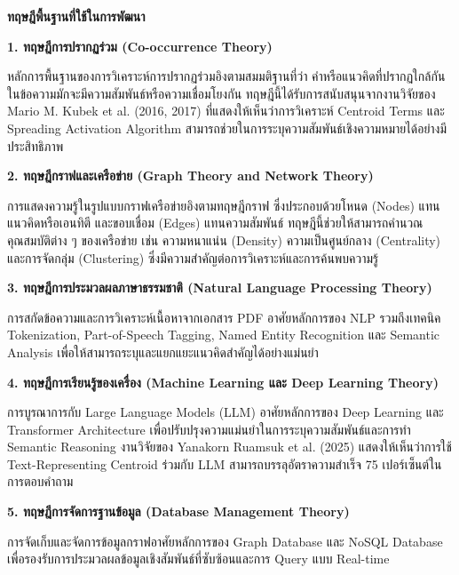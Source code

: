 \documentclass[12pt,a4paper]{article}
\begin{document}
\begin{enumerate}[leftmargin=2cm]
{\begin{enumerate}
            \textbf{ทฤษฎีพื้นฐานที่ใช้ในการพัฒนา}

            \textbf{1. ทฤษฎีการปรากฏร่วม (Co-occurrence Theory)}

            \hspace{1cm}หลักการพื้นฐานของการวิเคราะห์การปรากฏร่วมอิงตามสมมติฐานที่ว่า คำหรือแนวคิดที่ปรากฏใกล้กันในข้อความมักจะมีความสัมพันธ์หรือความเชื่อมโยงกัน ทฤษฎีนี้ได้รับการสนับสนุนจากงานวิจัยของ Mario M. Kubek et al. (2016, 2017) ที่แสดงให้เห็นว่าการวิเคราะห์ Centroid Terms และ Spreading Activation Algorithm สามารถช่วยในการระบุความสัมพันธ์เชิงความหมายได้อย่างมีประสิทธิภาพ

            \textbf{2. ทฤษฎีกราฟและเครือข่าย (Graph Theory and Network Theory)}

            \hspace{1cm}การแสดงความรู้ในรูปแบบกราฟเครือข่ายอิงตามทฤษฎีกราฟ ซึ่งประกอบด้วยโหนด (Nodes) แทนแนวคิดหรือเอนทิตี และขอบเชื่อม (Edges) แทนความสัมพันธ์ ทฤษฎีนี้ช่วยให้สามารถคำนวณคุณสมบัติต่าง ๆ ของเครือข่าย เช่น ความหนาแน่น (Density) ความเป็นศูนย์กลาง (Centrality) และการจัดกลุ่ม (Clustering) ซึ่งมีความสำคัญต่อการวิเคราะห์และการค้นพบความรู้

            \textbf{3. ทฤษฎีการประมวลผลภาษาธรรมชาติ (Natural Language Processing Theory)}

            \hspace{1cm}การสกัดข้อความและการวิเคราะห์เนื้อหาจากเอกสาร PDF อาศัยหลักการของ NLP รวมถึงเทคนิค Tokenization, Part-of-Speech Tagging, Named Entity Recognition และ Semantic Analysis เพื่อให้สามารถระบุและแยกแยะแนวคิดสำคัญได้อย่างแม่นยำ

            \textbf{4. ทฤษฎีการเรียนรู้ของเครื่อง (Machine Learning และ Deep Learning Theory)}

            \hspace{1cm}การบูรณาการกับ Large Language Models (LLM) อาศัยหลักการของ Deep Learning และ Transformer Architecture เพื่อปรับปรุงความแม่นยำในการระบุความสัมพันธ์และการทำ Semantic Reasoning งานวิจัยของ Yanakorn Ruamsuk et al. (2025) แสดงให้เห็นว่าการใช้ Text-Representing Centroid ร่วมกับ LLM สามารถบรรลุอัตราความสำเร็จ 75 เปอร์เซ็นต์ในการตอบคำถาม

            \textbf{5. ทฤษฎีการจัดการฐานข้อมูล (Database Management Theory)}

            \hspace{1cm}การจัดเก็บและจัดการข้อมูลกราฟอาศัยหลักการของ Graph Database และ NoSQL Database เพื่อรองรับการประมวลผลข้อมูลเชิงสัมพันธ์ที่ซับซ้อนและการ Query แบบ Real-time
        \end{enumerate}
    }


\end{enumerate}
\end{document}
